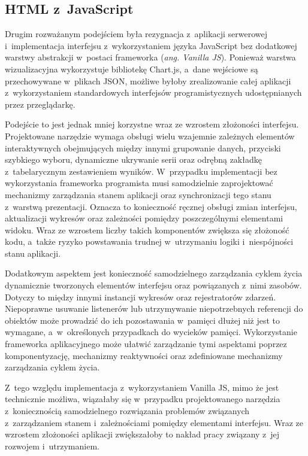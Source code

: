 \subsection{HTML z~JavaScript}
\label{subsec:html-z-javascript}

Drugim rozważanym podejściem była rezygnacja z~aplikacji serwerowej i~implementacja interfejsu z~wykorzystaniem języka JavaScript bez dodatkowej warstwy abstrakcji w~postaci frameworka (\textit{ang. Vanilla JS}).
Ponieważ warstwa wizualizacyjna wykorzystuje bibliotekę Chart.js, a~dane wejściowe są przechowywane w~plikach JSON, możliwe byłoby zrealizowanie całej aplikacji z~wykorzystaniem standardowych interfejsów programistycznych udostępnianych przez przeglądarkę.

Podejście to jest jednak mniej korzystne wraz ze wzrostem złożoności interfejsu.
Projektowane narzędzie wymaga obsługi wielu wzajemnie zależnych elementów interaktywnych obejmujących między innymi grupowanie danych, przyciski szybkiego wyboru, dynamiczne ukrywanie serii oraz odrębną zakładkę z~tabelarycznym zestawieniem wyników.
W~przypadku implementacji bez wykorzystania frameworka programista musi samodzielnie zaprojektować mechanizmy zarządzania stanem aplikacji oraz synchronizacji tego stanu z~warstwą prezentacji.
Oznacza to konieczność ręcznej obsługi zmian interfejsu, aktualizacji wykresów oraz zależności pomiędzy poszczególnymi elementami widoku.
Wraz ze wzrostem liczby takich komponentów zwiększa się złożoność kodu, a~także ryzyko powstawania trudnej w~utrzymaniu logiki i~niespójności stanu aplikacji.

Dodatkowym aspektem jest konieczność samodzielnego zarządzania cyklem życia dynamicznie tworzonych elementów interfejsu oraz powiązanych z~nimi zasobów.
Dotyczy to między innymi instancji wykresów oraz rejestratorów zdarzeń.
Niepoprawne usuwanie listenerów lub utrzymywanie niepotrzebnych referencji do obiektów może prowadzić do ich pozostawania w~pamięci dłużej niż jest to wymagane, a~w~określonych przypadkach do wycieków pamięci.
Wykorzystanie frameworka aplikacyjnego może ułatwić zarządzanie tymi aspektami poprzez komponentyzację, mechanizmy reaktywności oraz zdefiniowane mechanizmy zarządzania cyklem życia.

Z~tego względu implementacja z~wykorzystaniem Vanilla JS, mimo że jest technicznie możliwa, wiązałaby się w~przypadku projektowanego narzędzia z~koniecznością samodzielnego rozwiązania problemów związanych z~zarządzaniem stanem i~zależnościami pomiędzy elementami interfejsu.
Wraz ze wzrostem złożoności aplikacji zwiększałoby to nakład pracy związany z~jej rozwojem i~utrzymaniem.

